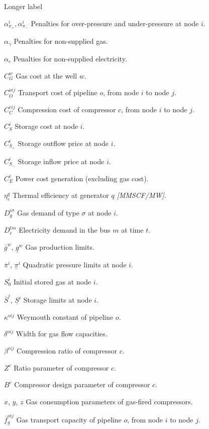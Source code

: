 \begin{labeling}{Longer label\quad}
\item [$\alpha^{i}_{\pi_+}, \alpha^{i}_{\pi _-}$] Penalties for over-pressure and under-pressure at node $i$.
\item [$\alpha_{\gamma}$] Penalties for non-supplied gas.
\item [$\alpha_{\epsilon}$] Penalties for non-supplied electricity.
\item [$C^{w}_{G}$] Gas cost at the well $w$.
\item [$C^{oij}_{O}$] Transport cost of pipeline $o$, from node $i$ to node $j$.
\item [$C^{cij}_{C}$] Compression cost of compressor $c$, from node $i$ to node $j$.
\item [$C^{i}_{S}$] Storage cost at node $i$.
\item [$C^{i}_{S_+}$] Storage outflow price at node $i$.
\item [$C^{i}_{S_-}$] Storage inflow price at node $i$.
\item [$C^{e}_{E}$] Power cost generation (excluding gas cost).
\item [$\eta^{q}_{e}$] Thermal efficiency at generator $q$ \textit{[MMSCF/MW]}.
\item [$D_{g}^{i \sigma}$] Gas demand of type $\sigma$ at node $i$.
\item [$D_{e}^{tm}$] Electricity demand in the bus $m$ at time $t$.
\item [$\bar{g}^{w}$, $\underline{g}^{w}$] Gas production limits.
\item [$\overline{\pi}^{i}$, $\underline{\pi}^{i}$] Quadratic pressure limits at node $i$.
\item [$S^{i}_{0}$] Initial stored gas at node $i$.
\item [$\overline{S}^{i}$, $\underline{S}^{i}$] Storage limits at node $i$.
\item [$\kappa^{oij}$] Weymouth constant of pipeline $o$.
\item [$\delta^{oij}$] Width for gas flow capacities.
\item [$\beta^{cij}$] Compression ratio of compressor $c$.
\item [$Z^{c}$] Ratio parameter of compressor $c$.
\item [$B^{c}$] Compressor design parameter of compressor $c$.
\item [$x$, $y$, $z$] Gas consumption parameters of gas-fired compressors.
\item [$\overline{f}^{oij}_{g}$] Gas transport capacity of pipeline $o$, from node $i$ to node $j$.

\end{labeling}
